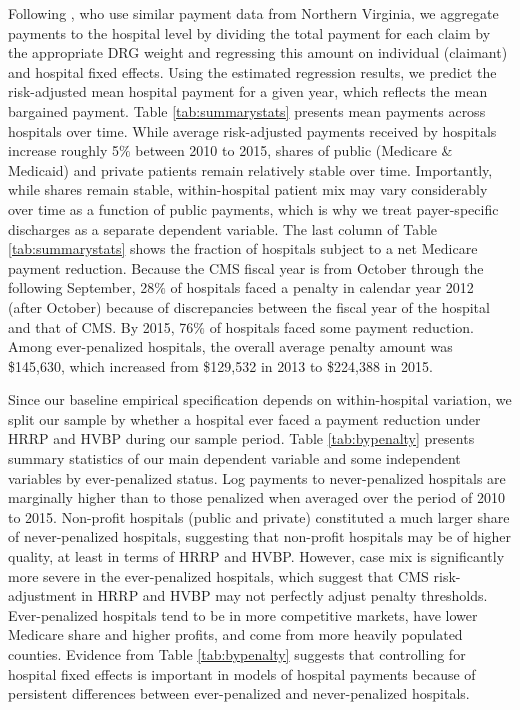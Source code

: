 \documentclass[12pt]{article}
\begin{document}
Following \citet{gowrisankaran2015}, who use similar payment data from Northern Virginia, we aggregate payments to the hospital level by dividing the total payment for each claim by the appropriate DRG weight and regressing this amount on individual (claimant) and hospital fixed effects.  Using the estimated regression results, we predict the risk-adjusted mean hospital payment for a given year, which reflects the mean bargained payment. Table \ref{tab:summarystats} presents mean payments across hospitals over time. While average risk-adjusted payments received by hospitals increase roughly 5$\%$ between 2010 to 2015, shares of public (Medicare \& Medicaid) and private patients remain relatively stable over time.  Importantly, while shares remain stable, within-hospital patient mix may vary considerably over time as a function of public payments, which is why we treat payer-specific discharges as a separate dependent variable.  The last column of Table \ref{tab:summarystats} shows the fraction of hospitals subject to a net Medicare payment reduction.  Because the CMS fiscal year is from October through the following September, 28$\%$ of hospitals faced a penalty in calendar year 2012 (after October) because of discrepancies between the fiscal year of the hospital and that of CMS.  By 2015, 76$\%$ of hospitals faced some payment reduction. Among ever-penalized hospitals, the overall average penalty amount was \$145,630, which increased from \$129,532 in 2013 to \$224,388 in 2015.

Since our baseline empirical specification depends on within-hospital variation, we split our sample by whether a hospital ever faced a payment reduction under HRRP and HVBP during our sample period.  Table \ref{tab:bypenalty} presents summary statistics of our main dependent variable and some independent variables by ever-penalized status.  Log payments to never-penalized hospitals are marginally higher than to those penalized when averaged over the period of 2010 to 2015.  Non-profit hospitals (public and private) constituted a much larger share of never-penalized hospitals, suggesting that non-profit hospitals may be of higher quality, at least in terms of HRRP and HVBP.  However, case mix is significantly more severe in the ever-penalized hospitals, which suggest that CMS risk-adjustment in HRRP and HVBP may not perfectly adjust penalty thresholds.  Ever-penalized hospitals tend to be in more competitive markets, have lower Medicare share and higher profits, and come from more heavily populated counties.  Evidence from Table \ref{tab:bypenalty} suggests that controlling for hospital fixed effects is important in models of hospital payments because of persistent differences between ever-penalized and never-penalized hospitals.
\end{document}
